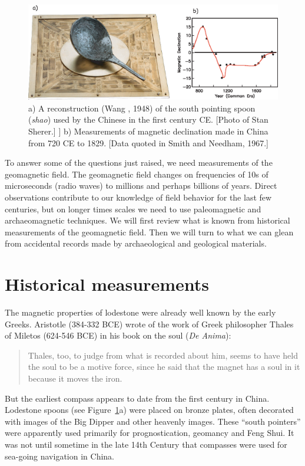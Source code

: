 \begin{figure}[htb]
\centering  \includegraphics[width=14 cm]{EPSfiles/chinesecompass.eps}
\caption{a) A reconstruction  (Wang , 1948) of the south pointing spoon ({\it shao}) used by the Chinese in the first century CE.  [Photo of Stan Sherer.] ] b) Measurements of magnetic declination made in China from 720 CE to 1829.   [Data quoted  in Smith and Needham, 1967.] }
\label{fig:spoon}
\end{figure}\nocite{wang48}\nocite{smith67}
\eject
To answer some of the questions just raised, we need measurements of the geomagnetic field.  
  The geomagnetic field changes on frequencies of 10s of microseconds (radio waves) to millions and perhaps billions of years.  Direct observations contribute to our knowledge of field behavior for the last few centuries, but on longer times scales we need to use paleomagnetic and archaeomagnetic techniques.    We will first review what is known from historical measurements of the geomagnetic field.  Then we will turn to what we can glean from accidental records made by archaeological and geological materials.  

\section{Historical measurements}
\label{sect:historical}

The magnetic properties of 
lodestone were already  well known  by the early Greeks.   Aristotle (384-332 BCE)  wrote of the work of Greek philosopher Thales of Miletos (624-546 BCE) in his book on the soul ({\it De Anima}): \begin{quote}
Thales, too, to judge from what is recorded about him, seems to have held the soul to be a motive force, since he said that the magnet has a soul in it because it moves the iron.
\end{quote}
But the earliest compass appears to date  from the first century in China.  Lodestone spoons (see Figure~\ref{fig:spoon}a) were placed on bronze plates, often decorated with images of the Big Dipper and other heavenly images.   These ``south pointers'' were apparently used primarily for  prognostication, geomancy and Feng Shui.   It was not until sometime in the late 14th Century that compasses were used for sea-going navigation in China.

